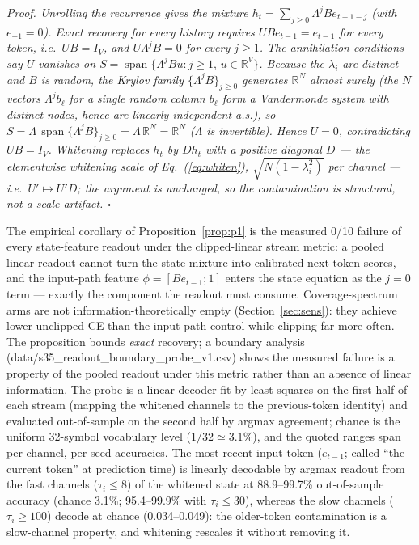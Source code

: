 \documentclass[preprint,12pt]{elsarticle}
\newcounter{proposition}[section]
\newenvironment{proof}{\noindent\itshape Proof.}{\hfill$\square$\par\medskip}
\begin{document}
\begin{proof}
Unrolling the recurrence gives the mixture
$h_t = \sum_{j\ge0} \Lambda^j B e_{t-1-j}$ (with $e_{-1} = 0$). Exact
recovery for every history requires
$U B e_{t-1} = e_{t-1}$ for every token, i.e.\ $U B = I_V$, and
$U \Lambda^j B = 0$ for every $j \ge 1$. The annihilation conditions say
$U$ vanishes on $S = \operatorname{span}\{\Lambda^j B u : j \ge 1,\,
u \in \mathbb{R}^V\}$. Because the $\lambda_i$ are distinct and $B$ is
random, the Krylov family $\{\Lambda^j B\}_{j\ge0}$ generates
$\mathbb{R}^N$ almost surely (the $N$ vectors $\Lambda^{j} b_\ell$ for a
single random column $b_\ell$ form a Vandermonde system with distinct
nodes, hence are linearly independent a.s.), so
$S = \Lambda\,\operatorname{span}\{\Lambda^j B\}_{j\ge0} =
\Lambda\,\mathbb{R}^N = \mathbb{R}^N$ ($\Lambda$ is invertible). Hence
$U = 0$, contradicting $U B = I_V$. Whitening replaces $h_t$ by
$D h_t$ with a positive diagonal $D$ --- the elementwise whitening
scale of Eq.~(\ref{eq:whiten}), $\sqrt{N(1-\lambda_i^2)}$ per channel
--- i.e.\ $U' \mapsto U' D$; the
argument is unchanged, so the contamination is structural, not a scale
artifact.
\end{proof}

The empirical corollary of Proposition~\ref{prop:p1} is the measured
0/10 failure of every state-feature readout under the clipped-linear
stream metric: a pooled linear readout
cannot turn the state mixture into calibrated next-token scores, and
the input-path feature $\phi = [B e_{t-1}; 1]$ enters the state
equation as the $j{=}0$ term --- exactly the component the readout must
consume. Coverage-spectrum arms are not information-theoretically empty
(Section~\ref{sec:sens}): they achieve lower unclipped CE than the
input-path control while clipping far more often. The proposition
bounds \emph{exact} recovery; a boundary
analysis (data/s35\_readout\_boundary\_probe\_v1.csv) shows the
measured failure is a property of the pooled readout under this metric
rather than an absence of linear information. The probe is a linear
decoder fit by least squares on the first half of each stream (mapping
the whitened channels to the previous-token identity) and evaluated
out-of-sample on the second half by argmax agreement; chance is the
uniform 32-symbol vocabulary level ($1/32 \simeq 3.1\%$), and the
quoted ranges span per-channel, per-seed accuracies. The most recent
input token ($e_{t-1}$; called ``the current token'' at prediction time)
is
linearly decodable by argmax readout from the fast channels ($\tau_i \le 8$) of the
whitened state at 88.9--99.7\% out-of-sample accuracy (chance 3.1\%;
95.4--99.9\% with $\tau_i \le 30$), whereas the slow channels
($\tau_i \ge 100$) decode at chance (0.034--0.049): the older-token
contamination is a slow-channel property, and whitening rescales it
without removing it.
\end{document}
